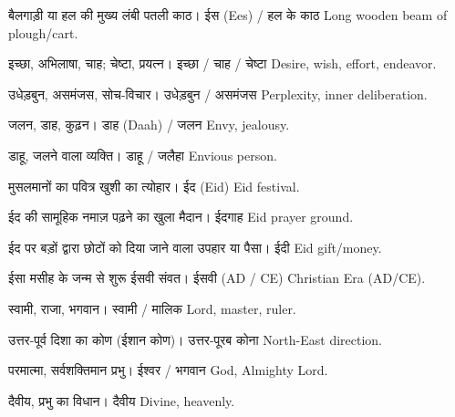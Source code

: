 %
{बैलगाड़ी या हल की मुख्य लंबी पतली काठ।}%
{ईस (Ees) / हल के काठ}%
{Long wooden beam of plough/cart.}

%
{इच्छा, अभिलाषा, चाह; चेष्टा, प्रयत्न।}%
{इच्छा / चाह / चेष्टा}%
{Desire, wish, effort, endeavor.}

%
{उधेड़बुन, असमंजस, सोच-विचार।}%
{उधेड़बुन / असमंजस}%
{Perplexity, inner deliberation.}

%
{जलन, डाह, कुढ़न।}%
{डाह (Daah) / जलन}%
{Envy, jealousy.}

%
{डाहू, जलने वाला व्यक्ति।}%
{डाहू / जलैहा}%
{Envious person.}

%
{मुसलमानों का पवित्र खुशी का त्योहार।}%
{ईद (Eid)}%
{Eid festival.}

%
{ईद की सामूहिक नमाज़ पढ़ने का खुला मैदान।}%
{ईदगाह}%
{Eid prayer ground.}

%
{ईद पर बड़ों द्वारा छोटों को दिया जाने वाला उपहार या पैसा।}%
{ईदी}%
{Eid gift/money.}

%
{ईसा मसीह के जन्म से शुरू ईसवी संवत।}%
{ईसवी (AD / CE)}%
{Christian Era (AD/CE).}

%
{स्वामी, राजा, भगवान।}%
{स्वामी / मालिक}%
{Lord, master, ruler.}

%
{उत्तर-पूर्व दिशा का कोण (ईशान कोण)।}%
{उत्तर-पूरब कोना}%
{North-East direction.}

%
{परमात्मा, सर्वशक्तिमान प्रभु।}%
{ईश्वर / भगवान}%
{God, Almighty Lord.}

%
{दैवीय, प्रभु का विधान।}%
{दैवीय}%
{Divine, heavenly.}

